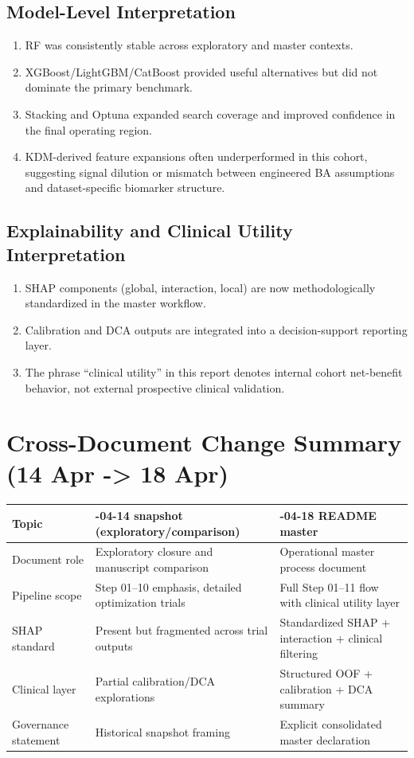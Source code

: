 ﻿\documentclass[11pt,a4paper]{article}
\begin{document}
\subsection{Model-Level Interpretation}

\begin{enumerate}
  \item RF was consistently stable across exploratory and master contexts.
  \item XGBoost/LightGBM/CatBoost provided useful alternatives but did not dominate the primary benchmark.
  \item Stacking and Optuna expanded search coverage and improved confidence in the final operating region.
  \item KDM-derived feature expansions often underperformed in this cohort, suggesting signal dilution or mismatch between engineered BA assumptions and dataset-specific biomarker structure.
\end{enumerate}

\subsection{Explainability and Clinical Utility Interpretation}

\begin{enumerate}
  \item SHAP components (global, interaction, local) are now methodologically standardized in the master workflow.
  \item Calibration and DCA outputs are integrated into a decision-support reporting layer.
  \item The phrase ``clinical utility'' in this report denotes internal cohort net-benefit behavior, not external prospective clinical validation.
\end{enumerate}

\section{Cross-Document Change Summary (14 Apr -> 18 Apr)}

\begin{longtable}{>{\raggedright\arraybackslash}p{3.6cm} >{\raggedright\arraybackslash}p{5.2cm} >{\raggedright\arraybackslash}p{5.6cm}}
\toprule
Topic & 2026-04-14 snapshot (exploratory/comparison) & 2026-04-18 README master \\
\midrule
Document role & Exploratory closure and manuscript comparison & Operational master process document \\
Pipeline scope & Step 01--10 emphasis, detailed optimization trials & Full Step 01--11 flow with clinical utility layer \\
SHAP standard & Present but fragmented across trial outputs & Standardized SHAP + interaction + clinical filtering \\
Clinical layer & Partial calibration/DCA explorations & Structured OOF + calibration + DCA summary \\
Governance statement & Historical snapshot framing & Explicit consolidated master declaration \\
\bottomrule
\end{longtable}
\end{document}
